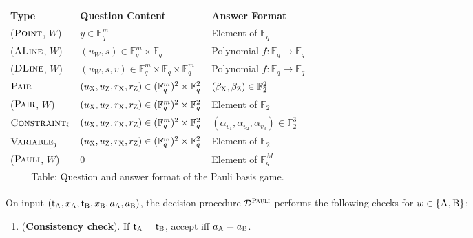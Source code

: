 \documentclass[11pt]{article}
\theoremstyle{definition}
\newcommand{\F}{\ensuremath{\mathbb{F}}}
\newcommand{\decider}{\mathcal{D}}
\newcommand{\gamestyle}[1]{\ensuremath{\textsc{#1}}\xspace}
\newcommand{\pauli}{\gamestyle{Pauli}}
\newcommand{\labelstyle}[1]{\ensuremath{\textsc{#1}}\xspace}
\newcommand{\xpt}{\labelstyle{X}}
\newcommand{\zpt}{\labelstyle{Z}}
\newcommand{\tvarstyle}[1]{\mathsf{#1}}
\newcommand{\tvar}{\ensuremath{\tvarstyle{t}}}
\newcommand{\alice}{\labelstyle{A}}
\newcommand{\bob}{\labelstyle{B}}
\newcommand{\typestyle}[1]{\ensuremath{\textsc{#1}}\xspace}
\newcommand{\Point}{\typestyle{Point}}
\newcommand{\ALine}{\typestyle{ALine}}
\newcommand{\DLine}{\typestyle{DLine}}
\newcommand{\Pair}{\typestyle{Pair}}
\newcommand{\Constraint}{\typestyle{Constraint}}
\newcommand{\Variable}{\typestyle{Variable}}
\newcommand{\Pauli}{\typestyle{Pauli}}
\newcommand{\AB}{\{\alice, \bob\}}
\newenvironment{gamespec}{
  \begin{mdframed}[style=figstyle]}{
  \end{mdframed}}
\begin{document}
\begin{figure}[H]
  \begin{gamespec}
    \vspace{9pt}
    \begin{center}
      \renewcommand\arraystretch{1.3}
      \begin{tabularx}{.92\textwidth}{ l X l }
        \toprule
        Type & Question Content & Answer Format \\
        \midrule
        (\Point, $W$) & $y \in  \F_q^m$ & Element of $\F_q$  \\
        (\ALine, $W$) & $(u_W, s) \in \F_q^m \times \F_q$
        & Polynomial $f: \F_q \to \F_q$\\
        (\DLine, $W$) & $(u_W, s, v) \in \F_q^m \times \F_q \times \F_q^m$ 
        & Polynomial $f: \F_q \to \F_q$ \\
        \Pair & $(u_\xpt, u_\zpt, r_\xpt, r_\zpt) \in
        (\F_q^m)^2 \times \F_q^2 $ & $(\beta_\xpt,\beta_\zpt) \in \F_2^2$ \\
        (\Pair, $W$) & $(u_\xpt, u_\zpt, r_\xpt, r_\zpt) \in
        (\F_q^m)^2 \times \F_q^2 $ & Element of $\F_2$ \\
        $\Constraint_i$ & $(u_\xpt, u_\zpt, r_\xpt, r_\zpt) \in (\F_q^m)^2
        \times \F_q^2$ &
        $(\alpha_{v_1}, \alpha_{v_2}, \alpha_{v_3}) \in \F_2^3$ \\
        $\Variable_j$ & $(u_\xpt, u_\zpt, r_\xpt, r_\zpt) \in
        (\F_q^m)^2 \times \F_q^2$ & Element of $\F_2$ \\
        (\Pauli, $W$) & $0$ & Element of $\F_q^{M}$ \\
        \bottomrule \multicolumn{3}{c}{Table: Question and answer format of the
          Pauli basis game.}
      \end{tabularx}
    \end{center}
    \vspace{9pt}

    On input $(\tvar_\alice,x_\alice, \tvar_\bob, x_\bob, a_\alice, a_\bob)$,
    the decision procedure $\decider^\pauli$ performs the following checks for
    $w \in \AB$:
    \begin{enumerate}[itemsep=2pt,parsep=2pt]
    \item (\textbf{Consistency check}).
      \label{item:same-type}
      If $\tvar_\alice = \tvar_\bob$, accept iff $a_\alice = a_\bob$.


\end{enumerate}
\end{gamespec}
\end{figure}
\end{document}
